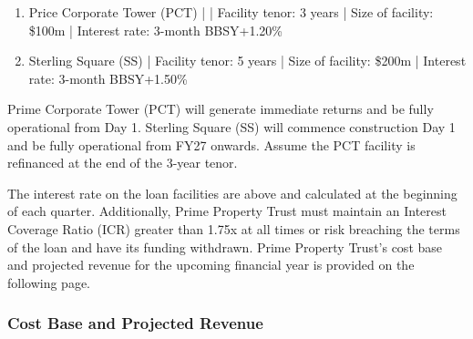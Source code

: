 \documentclass[11pt, a4paper, british]{article}
\begin{document}
\begin{enumerate}
    \item Price Corporate Tower (PCT) | | Facility tenor: 3 years | Size of facility: \$100m | Interest rate: 3-month BBSY+1.20\%
    \item Sterling Square (SS) | Facility tenor: 5 years | Size of facility: \$200m | Interest rate: 3-month BBSY+1.50\%
\end{enumerate}

Prime Corporate Tower (PCT) will generate immediate returns and be fully operational from Day 1. Sterling Square (SS) will commence construction Day 1 and be fully operational from FY27 onwards. Assume the PCT facility is refinanced at the end of the 3-year tenor. 

The interest rate on the loan facilities are above and calculated at the beginning of each quarter. Additionally, Prime Property Trust must maintain an Interest Coverage Ratio (ICR) greater than 1.75x at all times or risk breaching the terms of the loan and have its funding withdrawn. Prime Property Trust's cost base and projected revenue for the upcoming financial year is provided on the following page.

\newpage

\subsubsection{Cost Base and Projected Revenue}
\end{document}
